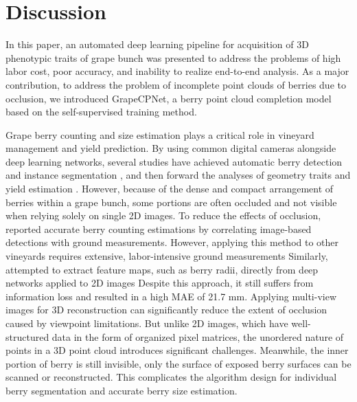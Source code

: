 \documentclass[12pt]{article}
\begin{document}
\section{Discussion}

In this paper, an automated deep learning pipeline for acquisition of 3D phenotypic traits of grape bunch was presented to address the problems of high labor cost, poor accuracy, and inability to realize end-to-end analysis. 
As a major contribution, to address the problem of incomplete point clouds of berries due to occlusion, we introduced GrapeCPNet, a berry point cloud completion model based on the self-supervised training method.

Grape berry counting and size estimation plays a critical role in vineyard management and yield prediction.
By using common digital cameras alongside deep learning networks, several studies have achieved automatic berry detection and instance segmentation \citep{jadhav_comparative_2021, chen_instance_2023}, and then forward the analyses of geometry traits and yield estimation \citep{quinones_gcnet_2025}.
However, because of the dense and compact arrangement of berries within a grape bunch, some portions are often occluded and not visible when relying solely on single 2D images.
To reduce the effects of occlusion, \citet{du_instance_2023} reported accurate berry counting estimations by correlating image-based detections with ground measurements.
However, applying this method to other vineyards requires extensive, labor-intensive ground measurements
Similarly, \citet{botturi_stewie_2023} attempted to extract feature maps, such as berry radii, directly from deep networks applied to 2D images
Despite this approach, it still suffers from information loss and resulted in a high MAE of 21.7 mm.
Applying multi-view images for 3D reconstruction can significantly reduce the extent of occlusion caused by viewpoint limitations.
But unlike 2D images, which have well-structured data in the form of organized pixel matrices, the unordered nature of points in a 3D point cloud introduces significant challenges.
Meanwhile, the inner portion of berry is still invisible, only the surface of exposed berry surfaces can be scanned or reconstructed.
This complicates the algorithm design for individual berry segmentation and accurate berry size estimation.
\end{document}
